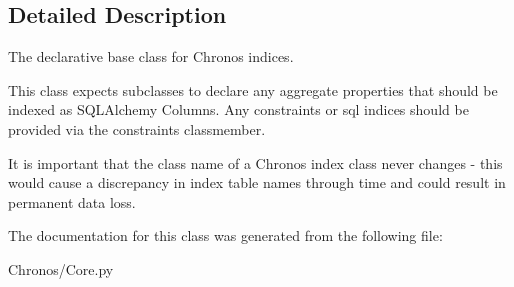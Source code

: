 \subsection{Detailed Description}
The declarative base class for Chronos indices. 

This class expects subclasses to declare any aggregate properties that should be indexed as S\+Q\+L\+Alchemy Columns. Any constraints or sql indices should be provided via the constraints classmember.

It is important that the class name of a Chronos index class never changes -\/ this would cause a discrepancy in index table names through time and could result in permanent data loss. 

The documentation for this class was generated from the following file\+:\begin{DoxyCompactItemize}
\item 
Chronos/Core.\+py\end{DoxyCompactItemize}
